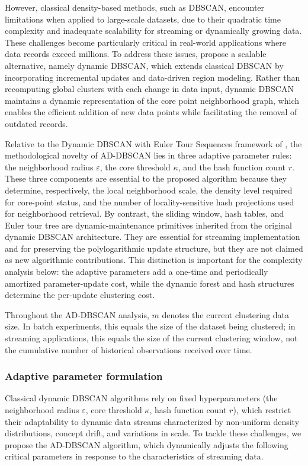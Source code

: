\documentclass[preprint,12pt,authoryear]{elsarticle}
\theoremstyle{definition}
\begin{document}
However, classical density-based methods, such as DBSCAN, encounter limitations when applied to large-scale datasets, due to their quadratic time complexity and inadequate scalability for streaming or dynamically growing data. These challenges become particularly critical in real-world applications where data records exceed millions. 
To address these issues, \citet{shin2025dynamic} propose a scalable alternative, namely dynamic DBSCAN, which extends classical DBSCAN by incorporating incremental updates and data-driven region modeling. Rather than recomputing global clusters with each change in data input, dynamic DBSCAN maintains a dynamic representation of the core point neighborhood graph, which enables the efficient addition of new data points while facilitating the removal of outdated records.


Relative to the Dynamic DBSCAN with Euler Tour Sequences framework of \citet{shin2025dynamic}, the methodological novelty of AD-DBSCAN lies in three adaptive parameter rules: the neighborhood radius $\varepsilon$, the core threshold $\kappa$, and the hash function count $r$. These three components are essential to the proposed algorithm because they determine, respectively, the local neighborhood scale, the density level required for core-point status, and the number of locality-sensitive hash projections used for neighborhood retrieval. By contrast, the sliding window, hash tables, and Euler tour tree are dynamic-maintenance primitives inherited from the original dynamic DBSCAN architecture. They are essential for streaming implementation and for preserving the polylogarithmic update structure, but they are not claimed as new algorithmic contributions. This distinction is important for the complexity analysis below: the adaptive parameters add a one-time and periodically amortized parameter-update cost, while the dynamic forest and hash structures determine the per-update clustering cost.

Throughout the AD-DBSCAN analysis, $m$ denotes the current clustering data size. In batch experiments, this equals the size of the dataset being clustered; in streaming applications, this equals the size of the current clustering window, not the cumulative number of historical observations received over time.



 
\subsubsection{Adaptive parameter formulation}
Classical dynamic DBSCAN algorithms rely on fixed hyperparameters (the neighborhood radius $\varepsilon$, core threshold $\kappa$, hash function count $r$), which restrict their adaptability to dynamic data streams characterized by non-uniform density distributions, concept drift, and variations in scale. To tackle these challenges, we propose the AD-DBSCAN algorithm, which dynamically adjusts the following critical parameters in response to the characteristics of streaming data.
\end{document}
